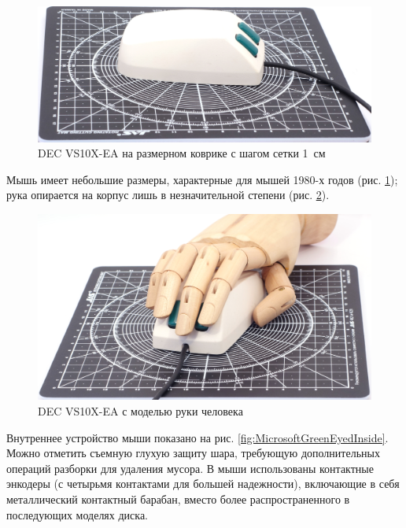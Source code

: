 \documentclass[11pt, a4paper]{article}
\begin{document}
\begin{figure}[h]
    \centering
    \includegraphics[scale=0.7]{1983_microsoft_green_eyed_mouse/size_30.jpg}
    \caption{DEC VS10X-EA на размерном коврике с шагом сетки 1~см}
    \label{fig:MicrosoftGreenEyedSize}
\end{figure}

Мышь имеет небольшие размеры, характерные для мышей 1980-х годов (рис. \ref{fig:MicrosoftGreenEyedSize}); рука опирается на корпус лишь в незначительной степени (рис. \ref{fig:MicrosoftGreenEyedHand}).

\begin{figure}[h]
    \centering
    \includegraphics[scale=0.7]{1983_microsoft_green_eyed_mouse/hand_30.jpg}
    \caption{DEC VS10X-EA с моделью руки человека}
    \label{fig:MicrosoftGreenEyedHand}
\end{figure}

Внутреннее устройство мыши показано на рис. \ref{fig:MicrosoftGreenEyedInside}. Можно отметить съемную глухую защиту шара, требующую дополнительных операций разборки для удаления мусора. В мыши использованы контактные энкодеры (с четырьмя контактами для большей надежности), включающие в себя металлический контактный барабан, вместо более распространенного в последующих моделях диска.
\end{document}
